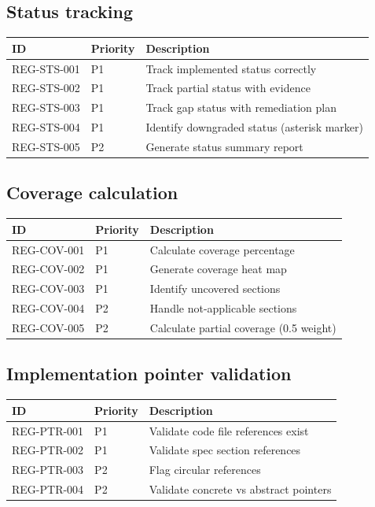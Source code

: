 \documentclass[11pt,a4paper,twoside]{report}
\begin{document}
\subsection{Status tracking}

\begin{tabularx}{\linewidth}{@{}l l X@{}}
\toprule
\textbf{ID} & \textbf{Priority} & \textbf{Description} \\ \midrule
REG-STS-001 & P1 & Track implemented status correctly \\
REG-STS-002 & P1 & Track partial status with evidence \\
REG-STS-003 & P1 & Track gap status with remediation plan \\
REG-STS-004 & P1 & Identify downgraded status (asterisk marker) \\
REG-STS-005 & P2 & Generate status summary report \\
\bottomrule
\end{tabularx}

\subsection{Coverage calculation}

\begin{tabularx}{\linewidth}{@{}l l X@{}}
\toprule
\textbf{ID} & \textbf{Priority} & \textbf{Description} \\ \midrule
REG-COV-001 & P1 & Calculate coverage percentage \\
REG-COV-002 & P1 & Generate coverage heat map \\
REG-COV-003 & P1 & Identify uncovered sections \\
REG-COV-004 & P2 & Handle not-applicable sections \\
REG-COV-005 & P2 & Calculate partial coverage (0.5 weight) \\
\bottomrule
\end{tabularx}

\subsection{Implementation pointer validation}

\begin{tabularx}{\linewidth}{@{}l l X@{}}
\toprule
\textbf{ID} & \textbf{Priority} & \textbf{Description} \\ \midrule
REG-PTR-001 & P1 & Validate code file references exist \\
REG-PTR-002 & P1 & Validate spec section references \\
REG-PTR-003 & P2 & Flag circular references \\
REG-PTR-004 & P2 & Validate concrete vs abstract pointers \\
\bottomrule
\end{tabularx}
\end{document}
